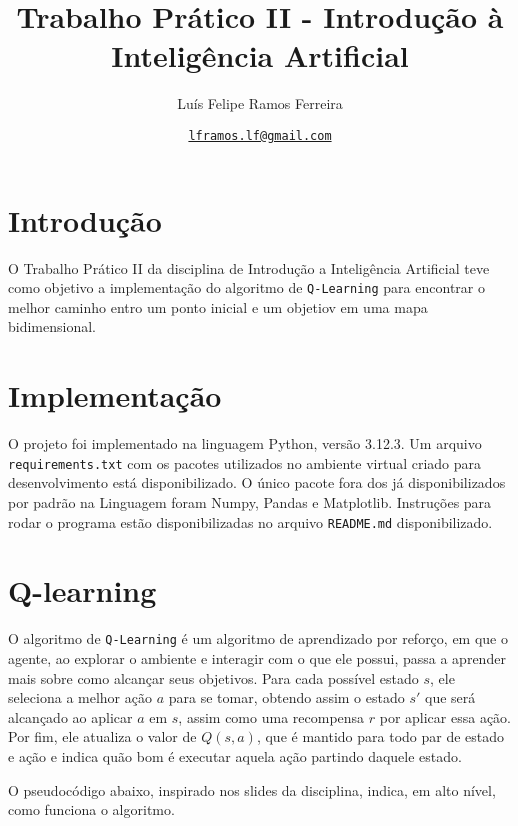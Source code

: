 \documentclass{article}
\title{Trabalho Prático II - Introdução à Inteligência Artificial}
\author{Luís Felipe Ramos Ferreira}
\date{\href{mailto:lframos.lf@gmail.com}{\texttt{lframos.lf@gmail.com}}
}
\begin{document}
\maketitle

\section{Introdução}

O Trabalho Prático II da disciplina de Introdução a Inteligência Artificial teve como objetivo a implementação do algoritmo de \texttt{Q-Learning}
para encontrar o melhor caminho entro um ponto inicial e um objetiov em uma mapa bidimensional.

\section{Implementação}

O projeto foi implementado na linguagem Python, versão 3.12.3. Um arquivo \texttt{requirements.txt} com os pacotes utilizados no ambiente virtual criado para desenvolvimento
está disponibilizado. O único pacote fora dos já disponibilizados por padrão na Linguagem foram Numpy, Pandas e Matplotlib. Instruções para rodar o programa estão disponibilizadas no
arquivo \texttt{README.md} disponibilizado.

\section{Q-learning}

O algoritmo de \texttt{Q-Learning} é um algoritmo de aprendizado por reforço, em que o agente, ao explorar o ambiente e interagir com o que ele possui,
passa a aprender mais sobre como alcançar seus objetivos. Para cada possível estado \(s\), ele seleciona a melhor ação \(a\) para se tomar, obtendo assim
o estado \(s'\) que será alcançado ao aplicar \(a\) em \(s\), assim como uma recompensa \(r\) por aplicar essa ação. Por fim, ele atualiza o valor de \(Q(s, a)\),
que é mantido para todo par de estado e ação e indica quão bom é executar aquela ação partindo daquele estado.

O pseudocódigo abaixo, inspirado nos slides da disciplina, indica, em alto nível, como funciona o algoritmo.
\end{document}
